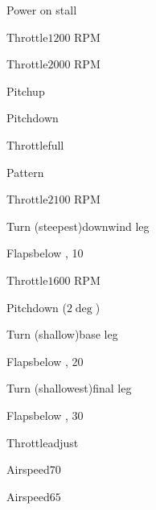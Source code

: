\begin{multicols}{2}
\begin{checklist}{Power on stall}
  \item{Throttle}{$1200$ RPM}
  \item{Throttle}{$2000$ RPM}
  \item{Pitch}{up}
  \item{Pitch}{down}
  \item{Throttle}{full}
\end{checklist}

\begin{checklist}{Pattern}
  \item{Throttle}{$2100$ RPM}

  \vspace{0.1em}
  \item{Turn (steepest)}{downwind leg}

  \vspace{0.1em}
  \item{Flaps}{below \vfe, 10\degree}

  \vspace{0.1em}
  \item{Throttle}{$1600$ RPM}
  \item{Pitch}{down ($2\deg$)}

  \vspace{0.1em}
  \item{Turn (shallow)}{base leg}

  \vspace{0.1em}
  \item{Flaps}{below \vfe, 20\degree}
  \item{Turn (shallowest)}{final leg}

  \vspace{0.1em}
  \item{Flaps}{below \vfe, 30\degree}
  \item{Throttle}{adjust}
  \item{Airspeed}{$70$}

  \vspace{0.1em}
  \item{Airspeed}{$65$}

  \vspace{0.1em}
\end{checklist}

\end{multicols}

